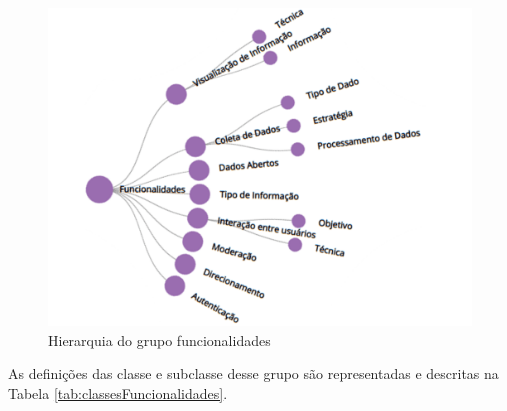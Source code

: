 \begin{figure}[!ht]
    \centering
    \includegraphics[scale=0.30]{./figuras/funcionalidades.png}
    \caption{Hierarquia do grupo funcionalidades}
    \label{fig:grupo-funcionalidades}
\end{figure}

\par
As definições das classe e subclasse desse grupo são representadas e descritas na Tabela \ref{tab:classesFuncionalidades}.

